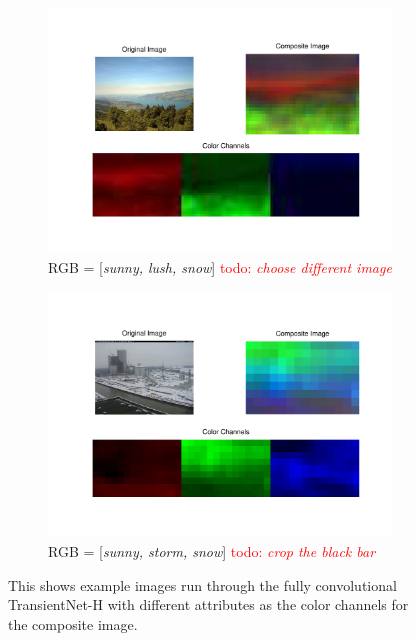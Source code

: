 \documentclass[10pt,twocolumn,letterpaper]{article}
\newcommand{\todo}[1]{\textcolor{red}{todo: {\em #1}}}
\begin{document}
\begin{figure}
  \centering
  \begin{subfigure}[b]{0.49\textwidth}
    \centering
		\includegraphics[width=\textwidth, trim= 15mm 17mm 10mm 10mm]{figs/false_color_7371.pdf}
    \caption{RGB = [\textit{sunny, lush, snow}]
             \todo{choose different image}}
    \label{fig:false_color_1}
  \end{subfigure}
  \begin{subfigure}[b]{0.49\textwidth}
    \centering
		\includegraphics[width=\textwidth, trim= 15mm 17mm 10mm 10mm]{figs/false_color_82.pdf}
    \caption{RGB = [\textit{sunny, storm, snow}] 
             \todo{crop the black bar}}
    \label{fig:false_color_2}
  \end{subfigure}
  \caption{This shows example images run through the fully convolutional
           TransientNet-H with different attributes as the color channels for
           the composite image.}
  \label{fig:false_color_ims}
\end{figure}
\end{document}
